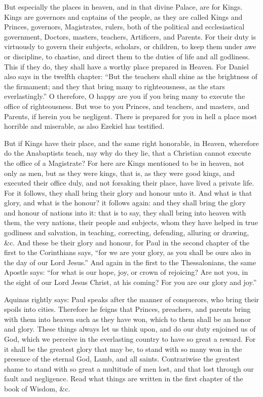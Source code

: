 But especially the places in heaven, and in that divine Palace, are for Kings. Kings are governors and captains of the people, as they are called Kings and Princes, governors, Magistrates, rulers, both of the political and ecclesiastical government, Doctors, masters, teachers, Artificers, and Parents. For their duty is virtuously to govern their subjects, scholars, or children, to keep them under awe or discipline, to chastise, and direct them to the duties of life and all godliness. This if they do, they shall have a worthy place prepared in Heaven. For Daniel also says in the twelfth chapter: “But the teachers shall shine as the brightness of the firmament; and they that bring many to righteousness, as the stars everlastingly.” O therefore, O happy are you if you bring many to execute the office of righteousness. But woe to you Princes, and teachers, and masters, and Parents, if herein you be negligent. There is prepared for you in hell a place most horrible and miserable, as also Ezekiel has testified.

But if Kings have their place, and the same right honorable, in Heaven, wherefore do the Anabaptists teach, nay why do they lie, that a Christian cannot execute the office of a Magistrate? For here are Kings mentioned to be in heaven, not only as men, but as they were kings, that is, as they were good kings, and executed their office duly, and not forsaking their place, have lived a private life. For it follows, they shall bring their glory and honour unto it. And what is that glory, and what is the honour? it follows again: and they shall bring the glory and honour of nations into it: that is to say, they shall bring into heaven with them, the very nations, their people and subjects, whom they have helped in true godliness and salvation, in teaching, correcting, defending, alluring or drawing, \&c. And these be their glory and honour, for Paul in the second chapter of the first to the Corinthians says, “for we are your glory, as you shall be ours also in the day of our Lord Jesus.” And again in the first to the Thessalonians, the same Apostle says: “for what is our hope, joy, or crown of rejoicing? Are not you, in the sight of our Lord Jesus Christ, at his coming? For you are our glory and joy.”

Aquinas rightly says: Paul speaks after the manner of conquerors, who bring their spoils into cities. Therefore he feigns that Princes, preachers, and parents bring with them into heaven such as they have won, which to them shall be an honor and glory. These things always let us think upon, and do our duty enjoined us of God, which we perceive in the everlasting country to have so great a reward. For it shall be the greatest glory that may be, to stand with so many won in the presence of the eternal God, Lamb, and all saints. Contrariwise the greatest shame to stand with so great a multitude of men lost, and that lost through our fault and negligence. Read what things are written in the first chapter of the book of Wisdom, \&c.

